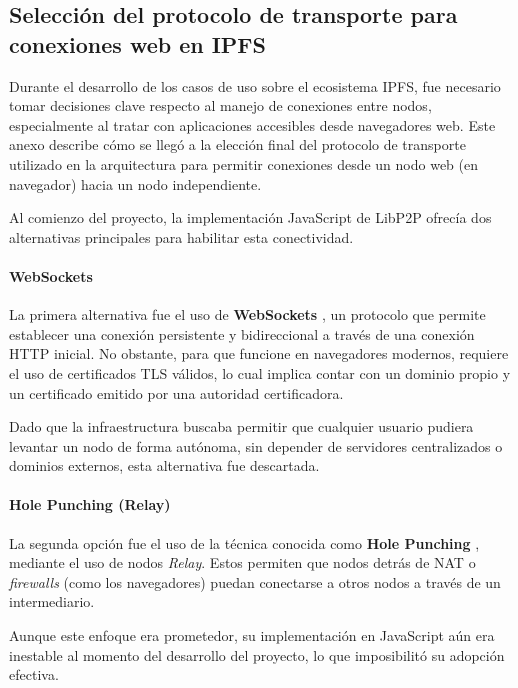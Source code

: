 \subsection{Selección del protocolo de transporte para conexiones web en IPFS}

Durante el desarrollo de los casos de uso sobre el ecosistema IPFS, fue necesario tomar decisiones clave respecto al manejo de conexiones entre nodos, especialmente al tratar con aplicaciones accesibles desde navegadores web. Este anexo describe cómo se llegó a la elección final del protocolo de transporte utilizado en la arquitectura para permitir conexiones desde un nodo web (en navegador) hacia un nodo independiente.

Al comienzo del proyecto, la implementación JavaScript de LibP2P ofrecía dos alternativas principales para habilitar esta conectividad.

\paragraph{WebSockets}

La primera alternativa fue el uso de \textbf{WebSockets} \cite{websocket}, un protocolo que permite establecer una conexión persistente y bidireccional a través de una conexión HTTP inicial. No obstante, para que funcione en navegadores modernos, requiere el uso de certificados TLS válidos, lo cual implica contar con un dominio propio y un certificado emitido por una autoridad certificadora.

Dado que la infraestructura buscaba permitir que cualquier usuario pudiera levantar un nodo de forma autónoma, sin depender de servidores centralizados o dominios externos, esta alternativa fue descartada.

\paragraph{Hole Punching (Relay)}

La segunda opción fue el uso de la técnica conocida como \textbf{Hole Punching} \cite{hole-punching}, mediante el uso de nodos \textit{Relay}. Estos permiten que nodos detrás de NAT o \textit{firewalls} (como los navegadores) puedan conectarse a otros nodos a través de un intermediario. 

Aunque este enfoque era prometedor, su implementación en JavaScript aún era inestable al momento del desarrollo del proyecto, lo que imposibilitó su adopción efectiva.

